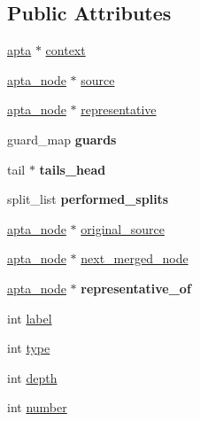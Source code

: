 \subsection*{Public Attributes}
\begin{DoxyCompactItemize}
\item 
\hyperlink{classapta}{apta} $\ast$ \hyperlink{classapta__node_ae216b528459a269d45957a919a6180e8}{context}
\item 
\hyperlink{classapta__node}{apta\+\_\+node} $\ast$ \hyperlink{classapta__node_a3988cbceb4424c44507237241a430aa4}{source}
\item 
\hyperlink{classapta__node}{apta\+\_\+node} $\ast$ \hyperlink{classapta__node_aaa89817381036872082c939d9c3e0094}{representative}
\item 
\mbox{\label{classapta__node_a883a1ae37bdb1a35b20ce9a9c420e1e8}} 
guard\+\_\+map {\bfseries guards}
\item 
\mbox{\label{classapta__node_a3853921f7e9474ef0fbdc6d7bb60b372}} 
tail $\ast$ {\bfseries tails\+\_\+head}
\item 
\mbox{\label{classapta__node_a3b84cb431615dfadb36aa7b9ec6c1f45}} 
split\+\_\+list {\bfseries performed\+\_\+splits}
\item 
\hyperlink{classapta__node}{apta\+\_\+node} $\ast$ \hyperlink{classapta__node_ad5fecd3dc4b9dfba4e68cf05af5ab34b}{original\+\_\+source}
\item 
\hyperlink{classapta__node}{apta\+\_\+node} $\ast$ \hyperlink{classapta__node_ae86864ade772ac79085a9c058f880f52}{next\+\_\+merged\+\_\+node}
\item 
\mbox{\label{classapta__node_ab7d0f47a91c2b78d8973e4aec45c2608}} 
\hyperlink{classapta__node}{apta\+\_\+node} $\ast$ {\bfseries representative\+\_\+of}
\item 
int \hyperlink{classapta__node_aaba8e9487f1161584177a708aa700bea}{label}
\item 
int \hyperlink{classapta__node_a9c1cf7c316ab485ff4435f90dda2766e}{type}
\item 
int \hyperlink{classapta__node_af55f64e7181c083d997bdf8b85cbe4d8}{depth}
\item 
int \hyperlink{classapta__node_aa4d8ad2056671f1e14ddb4123ac6f87e}{number}
\item 
\mbox{\label{classapta__node_adb2ae7e0890e5421c29ab7f67628f699}} 

\end{DoxyCompactItemize}
